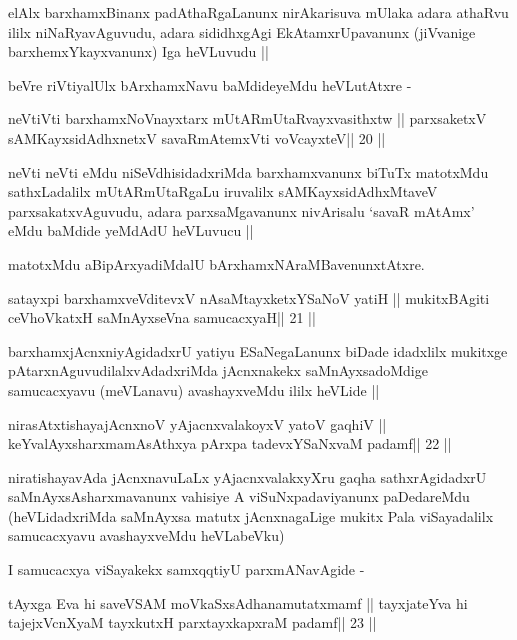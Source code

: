 \begin{artha}
elAlx barxhamxBinanx padAthaRgaLanunx nirAkarisuva mUlaka adara
athaRvu ililx niNaRyavAguvudu, adara sididhxgAgi EkAtamxrUpavanunx
(jiVvanige barxhemxYkayxvanunx) Iga heVLuvudu ||

beVre riVtiyalUlx bArxhamxNavu baMdideyeMdu heVLutAtxre -
\end{artha}

\begin{shl}
neVtiVti barxhamxNoV\s nayxtarx mUtARmUtaRvayxvasithxtw ||
parxsaketxV sAMKayxsidAdhxnetxV savaRmAtemxVti voVcayxteV\hfill || 20 ||
\end{shl}

\begin{artha}
neVti neVti eMdu niSeVdhisidadxriMda barxhamxvanunx biTuTx matotxMdu
sathxLadalilx mUtARmUtaRgaLu iruvalilx sAMKayxsidAdhxMtaveV
parxsakatxvAguvudu, adara parxsaMgavanunx nivArisalu `savaR mAtAmx'
eMdu baMdide yeMdAdU heVLuvucu ||

matotxMdu aBipArxyadiMdalU bArxhamxNAraMBavenunxtAtxre.
\end{artha}

\begin{shl}
satayxpi barxhamxveVditevxV nAsaMtayxketxYSaNoV yatiH ||
mukitxBAgiti ceVhoVkatxH saMnAyxseVna samucacxyaH\hfill || 21 ||
\end{shl}

\begin{artha}
barxhamxjAcnxniyAgidadxrU yatiyu ESaNegaLanunx biDade idadxlilx
mukitxge pAtarxnAguvudilalxvAdadxriMda jAcnxnakekx saMnAyxsadoMdige
samucacxyavu (meVLanavu) avashayxveMdu ililx heVLide ||
\end{artha}

\begin{shl}
nirasAtxtishayajAcnxnoV yAjacnxvalakoyxV yatoV gaqhiV ||
keYvalAyxsharxmamAsAthxya pArxpa tadevxYSaNxvaM padamf\hfill || 22 ||
\end{shl}

\begin{artha}
niratishayavAda jAcnxnavuLaLx yAjacnxvalakxyXru gaqha sathxrAgidadxrU
saMnAyxsAsharxmavanunx vahisiye A viSuNxpadaviyanunx paDedareMdu
(heVLidadxriMda saMnAyxsa matutx jAcnxnagaLige mukitx Pala
viSayadalilx samucacxyavu avashayxveMdu heVLabeVku)

I samucacxya viSayakekx samxqqtiyU parxmANavAgide -
\end{artha}

\begin{shl}
tAyxga Eva hi saveVSAM moVkaSxsAdhanamutatxmamf ||
tayxjateYva hi tajejxVcnXyaM tayxkutxH parxtayxkapxraM padamf\hfill || 23 ||
\end{shl}

